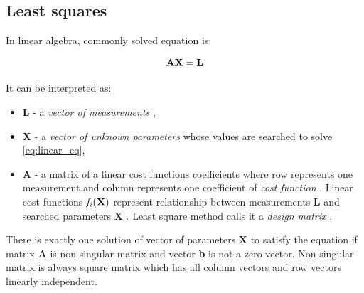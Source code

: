 \documentclass[a4paper,12pt]{article}
\newcommand{\ematr}[1]{%
{\bf #1}%
}
\newcommand{\evect}[1]{%
{\bf #1}%
}
\newcommand{\efunc}[1]{%
{\it #1}%
}
\newcommand{\term}[1]{%
{\it #1}%
}
\begin{document}

\subsection{Least squares}
\label{sec:least}


In linear algebra, commonly solved equation is:

\begin{equation}
\label{eq:linear_eq}
\ematr{A}\evect{X} = \evect{L} 
\end{equation} 




\noindent It can be interpreted as:
\begin{itemize}
\item \evect{L} - a \term{vector of measurements},
\item \evect{X} - a \term{vector of unknown parameters} whose values are searched to solve \eqref{eq:linear_eq},
\item \ematr{A} - a matrix of a linear cost functions coefficients  where row represents one measurement
		  and column represents one coefficient of \term{cost function}. Linear cost functions $\efunc{f_{i}(\evect{X})}$
		  represent relationship between measurements \evect{L} and searched parameters \evect{X}. 
		  Least square method calls it a \term{design matrix}. 
\end{itemize}



There is exactly one solution 
of vector of parameters  \evect{X} to satisfy the equation if matrix \ematr{A} is 
non singular matrix  and vector \evect{b} is not a zero vector. Non singular matrix is always square matrix
which has all column vectors and row vectors linearly independent. 
\end{document}
